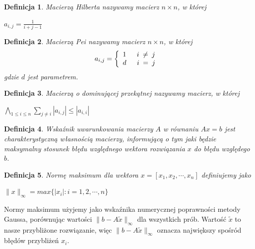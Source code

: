 \documentclass[a4paper,10pt]{article}
\newtheorem{definition}{Definicja}
\begin{document}
\begin{definition}
	Macierzą Hilberta nazywamy macierz $n \times n$, w której\\
    \begin{center}
    $a_{i,j} = \frac{1}{i+j-1}$
    \end{center}
\end{definition} 

\begin{definition}
	Macierzą Pei nazywamy macierz $n \times n$, w której\\
  \[
  a_{i,j} = \left\{
  \begin{array}{l l}
    1 \quad \texttt{ $i$ $\neq$ $j$ }\\
    d \quad \texttt{ $i$ $=$ $j$ }\\
  \end{array} \right.
  \]
    gdzie $d$ jest parametrem.
\end{definition}

\begin{definition}
    Macierzą o dominującej przekątnej nazywamy macierz, w której\\
    \begin{center}
    $ \bigwedge_{1 \leq i \leq n } \sum_{ j \neq i } |a_{i,j}| \leq |a_{i,i}| $
    \end{center}
\end{definition}

\begin{definition}
    Wskaźnik uwarunkowania macierzy $A$ w równaniu $Ax = b$ jest charakterystyczną własnością macierzy, informującą o tym jaki będzie maksymalny stosunek błędu względnego wektora rozwiązania $x$ do błędu względego $b$.
\end{definition}

\begin{definition}
    Normę maksimum dla wektora $x = \left[ x_{1}, x_{2}, \cdots , x_{n} \right] $ definiujemy jako\\
    \begin{center}
        $ \|x\|_{\infty} = max \{|x_{i}| : i = 1, 2, \cdots , n \}$
    \end{center}
\end{definition}

Normy maksimum użyjemy jako wskaźnika numerycznej poprawności metody Gaussa,
porównując wartości $ \| b - A \tilde{x} \|_{\infty}$ dla wszystkich prób.
Wartość $\tilde x$ to nasze przybliżone rozwiązanie, więc $\| b - A \tilde{x} \|_{\infty}$ oznacza największy spośród błędów przybliżeń $x_i$.
\end{document}
